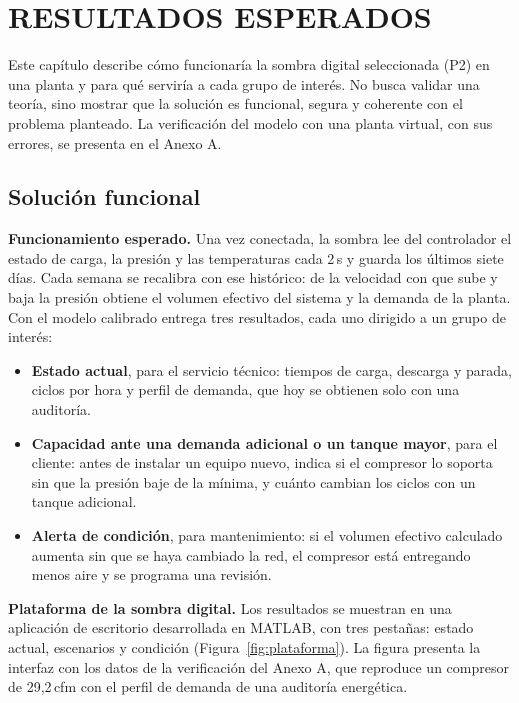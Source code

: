 
\chapter{RESULTADOS ESPERADOS}

Este capítulo describe cómo funcionaría la sombra digital seleccionada (P2) en una planta y para qué serviría a cada grupo de interés. No busca validar una teoría, sino mostrar que la solución es funcional, segura y coherente con el problema planteado. La verificación del modelo con una planta virtual, con sus errores, se presenta en el Anexo A.

\section{Solución funcional}

\textbf{Funcionamiento esperado.} Una vez conectada, la sombra lee del controlador el estado de carga, la presión y las temperaturas cada 2\,s y guarda los últimos siete días. Cada semana se recalibra con ese histórico: de la velocidad con que sube y baja la presión obtiene el volumen efectivo del sistema y la demanda de la planta. Con el modelo calibrado entrega tres resultados, cada uno dirigido a un grupo de interés:

\begin{itemize}
\item \textbf{Estado actual}, para el servicio técnico: tiempos de carga, descarga y parada, ciclos por hora y perfil de demanda, que hoy se obtienen solo con una auditoría.
\item \textbf{Capacidad ante una demanda adicional o un tanque mayor}, para el cliente: antes de instalar un equipo nuevo, indica si el compresor lo soporta sin que la presión baje de la mínima, y cuánto cambian los ciclos con un tanque adicional.
\item \textbf{Alerta de condición}, para mantenimiento: si el volumen efectivo calculado aumenta sin que se haya cambiado la red, el compresor está entregando menos aire y se programa una revisión.
\end{itemize}

\textbf{Plataforma de la sombra digital.} Los resultados se muestran en una aplicación de escritorio desarrollada en MATLAB, con tres pestañas: estado actual, escenarios y condición (Figura~\ref{fig:plataforma}). La figura presenta la interfaz con los datos de la verificación del Anexo A, que reproduce un compresor de 29,2\,cfm con el perfil de demanda de una auditoría energética.


